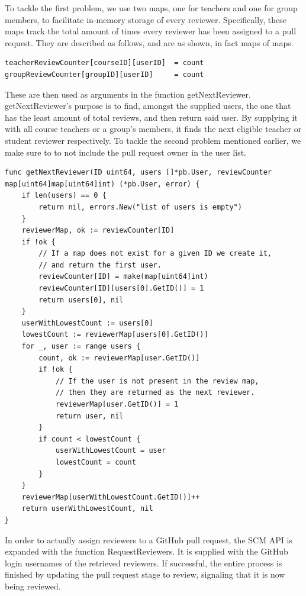To tackle the first problem, we use two maps, one for teachers and one for group members, to facilitate in-memory storage of every reviewer.
Specifically, these maps track the total amount of times every reviewer has been assigned to a pull request.
They are described as follows, and are as shown, in fact maps of maps.

\begin{lstlisting}[caption={Maps used to store review counts}, language=Golang, numbers=none, basicstyle=\ttfamily\footnotesize]
teacherReviewCounter[courseID][userID]  = count
groupReviewCounter[groupID][userID]     = count
\end{lstlisting}

These are then used as arguments in the function getNextReviewer.
getNextReviewer's purpose is to find, amongst the supplied users, the one that has the least amount of total reviews, and then return said user.
By supplying it with all course teachers or a group's members, it finds the next eligible teacher or student reviewer respectively.
To tackle the second problem mentioned earlier, we make sure to to not include the pull request owner in the user list.

\begin{lstlisting}[caption={The getNextReviewer function}, language=Golang, commentstyle={\slshape}]
func getNextReviewer(ID uint64, users []*pb.User, reviewCounter map[uint64]map[uint64]int) (*pb.User, error) {
	if len(users) == 0 {
		return nil, errors.New("list of users is empty")
	}
	reviewerMap, ok := reviewCounter[ID]
	if !ok {
		// If a map does not exist for a given ID we create it,
		// and return the first user.
		reviewCounter[ID] = make(map[uint64]int)
		reviewCounter[ID][users[0].GetID()] = 1
		return users[0], nil
	}
	userWithLowestCount := users[0]
	lowestCount := reviewerMap[users[0].GetID()]
	for _, user := range users {
		count, ok := reviewerMap[user.GetID()]
		if !ok {
			// If the user is not present in the review map,
			// then they are returned as the next reviewer.
			reviewerMap[user.GetID()] = 1
			return user, nil
		}
		if count < lowestCount {
			userWithLowestCount = user
			lowestCount = count
		}
	}
	reviewerMap[userWithLowestCount.GetID()]++
	return userWithLowestCount, nil
}
\end{lstlisting}

In order to actually assign reviewers to a GitHub pull request, the SCM API is expanded with the function RequestReviewers.
It is supplied with the GitHub login usernames of the retrieved reviewers.
If successful, the entire process is finished by updating the pull request stage to review, signaling that it is now being reviewed.

